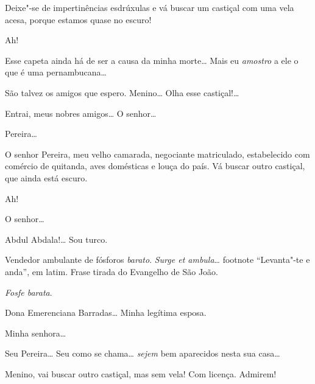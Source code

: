  Deixe"-se de
impertinências esdrúxulas e vá buscar um
castiçal com uma vela acesa, porque estamos quase no
escuro!

  
Ah! 

 Esse capeta ainda há de
ser a causa da minha morte\ldots{} Mais eu \textit{amostro}
a  ele o que é uma pernambucana\ldots{} 

 São talvez os
amigos que espero. 
Menino\ldots{} Olha esse
castiçal!\ldots{} 



 Entrai, meus nobres amigos\ldots{} 
O senhor\ldots

 Pereira\ldots

 O senhor Pereira, meu velho
camarada, negociante matriculado, estabelecido com comércio
de quitanda, aves domésticas e louça do
país.  Vá buscar outro castiçal,
que ainda está escuro.

 
Ah! 

 
O senhor\ldots

 Abdul Abdala!\ldots{} 
Sou turco.

 Vendedor
ambulante de fósforos \textit{barato}. \textit{Surge et
ambula}\ldots{} footnote{
``Levanta"-te e anda'', em latim. Frase tirada do Evangelho de São João.}

 \textit{Fosfe barata}. 

 Dona
Emerenciana Barradas\ldots{} Minha legítima esposa.

 Minha senhora\ldots

  
Seu Pereira\ldots{} Seu como se chama\ldots{} \textit{sejem} bem
aparecidos nesta sua casa\ldots

 
Menino, vai buscar outro
castiçal, mas sem vela!  Com licença.
Admirem!

